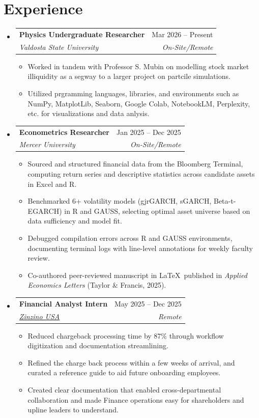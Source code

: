 \documentclass[letterpaper,11.000000001 pt]{article}
\makeatletter
\newcommand{\resumeItem}[1]{
  \item\small{
    {#1 \vspace{-1pt}}
  }
}
\newcommand{\resumeSubheading}[4]{
  \vspace{-1pt}\item
    \begin{tabular*}{0.97\textwidth}[t]{l@{\extracolsep{\fill}}r}
      \textbf{#1} & #2 \\
      \textit{\small#3} & \textit{\small #4} \\
    \end{tabular*}\vspace{-6pt}
}
\newcommand{\resumeSubHeadingListStart}{\begin{itemize}[leftmargin=0.15in, label={}]}
\newcommand{\resumeSubHeadingListEnd}{\end{itemize}}
\newcommand{\resumeItemListStart}{\begin{itemize}}
\newcommand{\resumeItemListEnd}{\end{itemize}\vspace{-5pt}}
\makeatother
\begin{document}
\section{Experience}
  \resumeSubHeadingListStart
  \resumeSubheading
      {Physics Undergraduate Researcher}{Mar 2026 – Present}
      {Valdosta State University}{On-Site/Remote}
      \resumeItemListStart
        \resumeItem{Worked in tandem with Professor S. Mubin on modelling stock market illiquidity as a segway to a larger project on partcile simulations.}
        \resumeItem{Utilized prgramming languages, libraries, and environments such as NumPy, MatplotLib, Seaborn, Google Colab, NotebookLM, Perplexity, etc. for visualizations and data anlysis.}
        \resumeItemListEnd
    \resumeSubheading
      {Econometrics Researcher}{Jan 2025 – Dec 2025}
      {Mercer University}{On-Site/Remote}
      \resumeItemListStart
        \resumeItem{Sourced and structured financial data from the Bloomberg Terminal, computing return series and descriptive statistics across candidate assets in Excel and R.}
        \resumeItem{Benchmarked 6+ volatility models (gjrGARCH, sGARCH, Beta-t-EGARCH) in R and GAUSS, selecting optimal asset universe based on data sufficiency and model fit.}
        \resumeItem{Debugged compilation errors across R and GAUSS environments, documenting terminal logs with line-level annotations for weekly faculty review.}
        \resumeItem{Co-authored peer-reviewed manuscript in \LaTeX\ published in \textit{Applied Economics Letters} (Taylor \& Francis, 2025).}
      \resumeItemListEnd
  \resumeSubHeadingListEnd

  \resumeSubHeadingListStart  
    \resumeSubheading
      {Financial Analyst Intern}{May 2025 – Dec 2025}
      {\href{https://www.zinzino.com/site/us/en-us/}{Zinzino USA}}{Remote}
      \resumeItemListStart
        \resumeItem{Reduced chargeback processing time by 87\% through workflow digitization and documentation streamlining.}
        \resumeItem{Refined the charge back process within a few weeks of arrival, and curated a reference guide to aid future onboarding employees.}
        \resumeItem{Created clear documentation that enabled cross-departmental collaboration and made Finance operations easy for shareholders and upline leaders to understand.}
      \resumeItemListEnd
  \resumeSubHeadingListEnd


\end{document}
